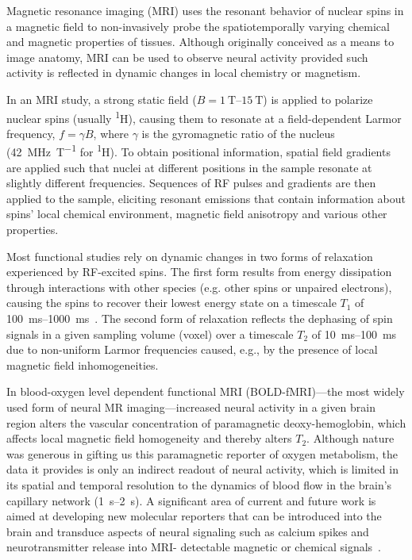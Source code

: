 Magnetic resonance imaging (MRI) uses the resonant behavior of nuclear spins in a magnetic field to non-invasively probe the spatiotemporally varying chemical and magnetic properties of tissues.
Although originally conceived as a means to image anatomy, MRI can be used to observe neural activity provided such activity is reflected in dynamic changes in local chemistry or magnetism.

In an MRI study, a strong static field ($B = \SIrange{1}{15}{\tesla}$) is applied to polarize nuclear spins (usually \textsuperscript{1}H), causing them to resonate at a field-dependent Larmor frequency, $f=\gamma B$, where $\gamma$ is the gyromagnetic ratio of the nucleus (\SI{42}{\MHz\per\tesla} for \textsuperscript{1}H). %
To obtain positional information, spatial field gradients are applied such that nuclei at different positions in the sample resonate at slightly different frequencies.
Sequences of RF pulses and gradients are then applied to the sample, eliciting resonant emissions that contain information about spins' local chemical environment, magnetic field anisotropy and various other properties.

Most functional studies rely on dynamic changes in two forms of relaxation experienced by RF-excited spins.
The first form results from energy dissipation through interactions with other species (e.g. other spins or unpaired electrons), causing the spins to recover their lowest energy state on a timescale $T_1$ of \SIrange{100}{1000}{\milli\second}~\cite{rooney07}.
The second form of relaxation reflects the dephasing of spin signals in a given sampling volume (voxel) over a timescale $T_2$ of \SIrange{10}{100}{\milli\second}~\cite{deichmann95} due to non-uniform Larmor frequencies caused, e.g., by the presence of local magnetic field inhomogeneities.

In blood-oxygen level dependent functional MRI (BOLD-fMRI)---the most widely used form of neural MR imaging---increased neural activity in a given brain region alters the vascular concentration of paramagnetic deoxy-hemoglobin, which affects local magnetic field homogeneity and thereby alters $T_2$.
Although nature was generous in gifting us this paramagnetic reporter of oxygen metabolism, the data it provides is only an indirect readout of neural activity, which is limited in its spatial and temporal resolution to the dynamics of blood flow in the brain's capillary network (\SIrange{1}{2}{\second}).
A significant area of current and future work is aimed at developing new molecular reporters that can be introduced into the brain and transduce aspects of neural signaling such as calcium spikes and neurotransmitter release into MRI- detectable magnetic or chemical signals~\cite{shapiro10,koretsky12,hsieh12}.

